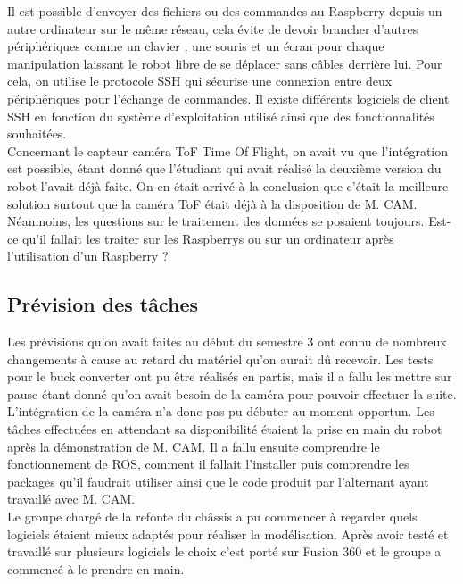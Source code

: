 Il est possible d’envoyer des fichiers ou des commandes au Raspberry depuis un autre ordinateur sur le même réseau, cela évite de devoir brancher d'autres périphériques comme un clavier , une souris et un écran pour chaque manipulation laissant le robot libre de se déplacer sans câbles derrière lui. Pour cela, on utilise le protocole SSH qui sécurise une connexion entre deux périphériques pour l’échange de commandes. Il existe différents logiciels de client SSH en fonction du système d’exploitation utilisé ainsi que des fonctionnalités souhaitées.\\

Concernant le capteur caméra ToF Time Of Flight, on avait vu que l’intégration est possible, étant donné que l’étudiant qui avait réalisé la deuxième version du robot l’avait déjà faite.
On en était arrivé à la conclusion que c'était la meilleure solution surtout que la caméra ToF était déjà à la disposition de M. CAM.
Néanmoins, les questions sur le traitement des données se posaient toujours. Est-ce qu'il fallait les traiter sur les Raspberrys ou sur un ordinateur après l’utilisation d’un Raspberry ?  

\subsection{Prévision des tâches}


Les prévisions qu’on avait faites au début du semestre 3 ont connu de nombreux changements à cause au retard du matériel qu’on aurait dû recevoir. 
Les tests pour le buck converter ont pu être réalisés en partis, mais il a fallu les mettre sur pause étant donné qu’on avait besoin de la caméra pour pouvoir effectuer la suite.\\
L’intégration de la caméra n’a donc pas pu débuter au moment opportun. Les tâches effectuées en attendant sa disponibilité étaient la prise en main du robot après la démonstration de M. CAM.
Il a fallu ensuite comprendre le fonctionnement de ROS, comment il fallait l’installer puis comprendre les packages qu’il faudrait utiliser ainsi que le code produit par l’alternant ayant travaillé avec M. CAM.\\
Le groupe chargé de la refonte du châssis a pu commencer à regarder quels logiciels étaient mieux adaptés pour réaliser la modélisation. Après avoir testé et travaillé sur plusieurs logiciels le choix c’est porté sur Fusion 360 et le groupe a commencé à le prendre en main.\\

